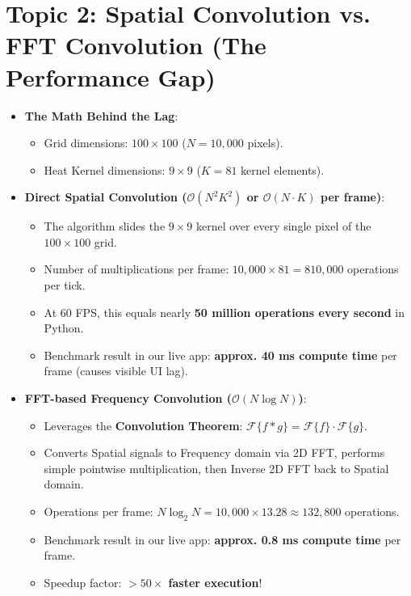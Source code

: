 \documentclass[11pt]{book}
\begin{document}
\section{Topic 2: Spatial Convolution vs. FFT Convolution (The Performance Gap)}
\begin{itemize}
    \item \textbf{The Math Behind the Lag}:
    \begin{itemize}
        \item Grid dimensions: $100 \times 100$ ($N = 10,000$ pixels).
        \item Heat Kernel dimensions: $9 \times 9$ ($K = 81$ kernel elements).
    \end{itemize}
    \item \textbf{Direct Spatial Convolution ($\mathcal{O}(N^2 K^2)$ or $\mathcal{O}(N \cdot K)$ per frame)}:
    \begin{itemize}
        \item The algorithm slides the $9 \times 9$ kernel over every single pixel of the $100 \times 100$ grid.
        \item Number of multiplications per frame: $10,000 \times 81 = 810,000$ operations per tick.
        \item At 60 FPS, this equals nearly \textbf{50 million operations every second} in Python.
        \item Benchmark result in our live app: \textbf{approx. 40 ms compute time} per frame (causes visible UI lag).
    \end{itemize}
    \item \textbf{FFT-based Frequency Convolution ($\mathcal{O}(N \log N)$)}:
    \begin{itemize}
        \item Leverages the \textbf{Convolution Theorem}: $\mathcal{F}\{f * g\} = \mathcal{F}\{f\} \cdot \mathcal{F}\{g\}$.
        \item Converts Spatial signals to Frequency domain via 2D FFT, performs simple pointwise multiplication, then Inverse 2D FFT back to Spatial domain.
        \item Operations per frame: $N \log_2 N = 10,000 \times 13.28 \approx 132,800$ operations.
        \item Benchmark result in our live app: \textbf{approx. 0.8 ms compute time} per frame.
        \item Speedup factor: \textbf{$>50\times$ faster execution}!
    \end{itemize}
\end{itemize}
\end{document}
